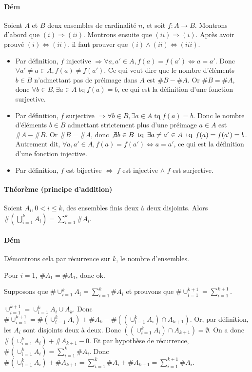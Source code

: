 \documentclass{article}
\DeclareMathOperator{\tq}{\text{ tq }}
\begin{document}
			\paragraph{Dém} Soient $A$ et $B$ deux ensembles de cardinalité $n$, et soit $f : A \to B$. Montrons d'abord que $(i) \Rightarrow (ii)$. Montrons ensuite que
			$(ii) \Rightarrow (i)$. Après avoir prouvé $(i) \iff (ii)$, il faut prouver que $(i) \land (ii) \iff (iii)$.
			
			\begin{itemize}
				\item Par définition, $f$ injective $\Rightarrow \forall a, a' \in A, f(a) = f(a') \iff a = a'$. Donc $\forall a' \neq a \in A, f(a) \neq f(a')$.
				Ce qui veut dire que le nombre d'éléments $b \in B$ n'admettant pas de préimage dans $A$ est $\#B - \#A$. Or $\#B = \#A$, donc
				$\forall b \in B, \exists a \in A \tq f(a) = b$, ce qui est la définition d'une fonction surjective.
				\item Par définition, $f$ surjective $\Rightarrow \forall b \in B, \exists a \in A \tq f(a) = b$. Donc le nombre d'éléments $b \in B$ admettant
				strictement plus d'une préimage $a \in A$ est $\#A - \#B$. Or $\#B = \#A$, donc $\not \exists b \in B \tq \exists a \neq a' \in A \tq f(a) = f(a') = b$.
				Autrement dit, $\forall a, a' \in A, f(a) = f(a') \iff a = a'$, ce qui est la définition d'une fonction injective.
				\item Par définition, $f$ est bijective $\iff$ $f$ est injective $\land$ $f$ est surjective.
			\end{itemize}
			
			\paragraph{Théorème (principe d'addition)} Soient $A_i, 0 < i \leq k$, des ensembles finis deux à deux disjoints. Alors $\#\left(\bigcup_{i=1}^kA_i\right) =
			\sum_{i=1}^k\#A_i$.
			
			\paragraph{Dém} Démontrons cela par récurrence sur $k$, le nombre d'ensembles.
			
			Pour $i = 1$, $\#A_1 = \#A_1$, donc ok.
			
			Supposons que $\#\cup_{i=1}^kA_i = \sum_{i=1}^k\#A_i$ et prouvons que $\#\cup_{i=1}^{k+1} = \sum_{i=1}^{k+1}$.
			
			$\cup_{i=1}^{k+1} = \cup_{i=1}^kA_i \cup A_k$. Donc $\#\cup_{i=1}^{k+1} = \#(\cup_{i=1}^kA_i) + \#A_k - \#((\cup_{i=1}^kA_i) \cap A_{k+1})$.
			Or, par définition, les $A_i$ sont disjoints deux à deux. Donc $((\cup_{i=1}^kA_i) \cap A_{k+1}) = \emptyset$. On a donc $\#(\cup_{i=1}^kA_i) + \#A_{k+1} - 0$.
			Et par hypothèse de récurrence, $\#(\cup_{i=1}^kA_i) = \sum_{i=1}^k\#A_i$. Donc $\#(\cup_{i=1}^kA_i) + \#A_{k+1} = \sum_{i=1}^k\#A_i + \#A_{k+1} =
			\sum_{i=1}^{k+1}\#A_i$.
			
\end{document}
